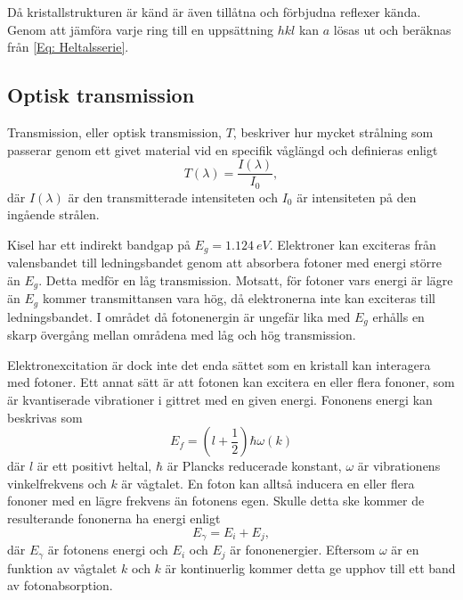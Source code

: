 \documentclass[12pt, a4paper]{article}
\begin{document}
Då kristallstrukturen är känd är även tillåtna och förbjudna reflexer kända. 
Genom att jämföra varje ring till en uppsättning $hkl$ kan $a$ lösas ut och beräknas från \ref{Eq: Heltalsserie}.

\subsection{Optisk transmission}

Transmission, eller optisk transmission, $T$, beskriver hur mycket strålning som passerar genom ett givet material vid en specifik våglängd och definieras enligt
\begin{equation}
    T(\lambda) = \frac{I(\lambda)}{I_0},
\end{equation}
där $I(\lambda)$ är den transmitterade intensiteten och $I_0$ är intensiteten på den ingående strålen\cite{Transmission}.

Kisel har ett indirekt bandgap på $E_g = \SI{1,124}{eV}$\cite{physics_handbook}. 
Elektroner kan exciteras från valensbandet till ledningsbandet genom att absorbera fotoner med energi större än $E_g$. 
Detta medför en låg transmission. Motsatt, för fotoner vars energi är lägre än $E_g$ kommer transmittansen vara hög, då elektronerna inte kan exciteras till ledningsbandet. 
I området då fotonenergin är ungefär lika med $E_g$ erhålls en skarp övergång mellan områdena med låg och hög transmission.

Elektronexcitation är dock inte det enda sättet som en kristall kan interagera med fotoner.
Ett annat sätt är att fotonen kan excitera en eller flera fononer, som är kvantiserade vibrationer i gittret med en given energi\cite{Klemens_phonon}.
Fononens energi kan beskrivas som 
\begin{equation}
    E_f = \left(l + \frac{1}{2}\right)\hbar \omega(k)
    \label{eq:fonon_energi}
\end{equation}
där $l$ är ett positivt heltal, $\hbar$ är Plancks reducerade konstant, $\omega$ är vibrationens vinkelfrekvens och $k$ är vågtalet.
En foton kan alltså inducera en eller flera fononer med en lägre frekvens än fotonens egen.
Skulle detta ske kommer de resulterande fononerna ha energi enligt
\begin{equation}
    E_\gamma = E_i + E_j,
    \label{Eq:multifononabsorption}
\end{equation}
där $E_\gamma$ är fotonens energi och $E_i$ och $E_j$ är fononenergier.
Eftersom $\omega$ är en funktion av vågtalet $k$ och $k$ är kontinuerlig \cite{Hofmann} kommer detta ge upphov till ett band av fotonabsorption.
\end{document}

